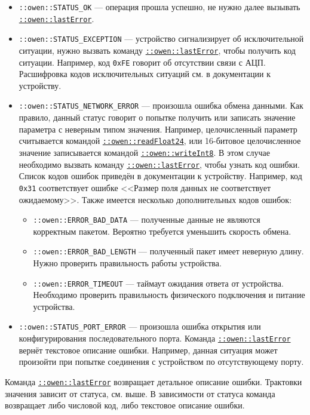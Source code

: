 \documentclass[12pt, a4paper]{article}
\newcommand{\CMD}[1]{{\tt \hyperref[#1]{#1}}}
\begin{document}
\begin{itemize}
\item {\tt ::owen::STATUS\_OK} --- операция прошла успешно, не нужно далее вызывать \CMD{::owen::lastError}.

\item {\tt ::owen::STATUS\_EXCEPTION} --- устройство сигнализирует об исключительной ситуации, нужно вызвать команду \CMD{::owen::lastError}, чтобы получить код ситуации. Например, код {\tt 0xFE} говорит об отсутствии связи с АЦП. Расшифровка кодов исключительных ситуаций см. в документации к устройству.

\item {\tt ::owen::STATUS\_NETWORK\_ERROR} --- произошла ошибка обмена данными. Как правило, данный статус говорит о попытке получить или записать значение параметра с неверным типом значения. Например, целочисленный параметр считывается командой \CMD{::owen::readFloat24}, или 16-битовое целочисленное значение записывается командой \CMD{::owen::writeInt8}. В этом случае необходимо вызвать команду \CMD{::owen::lastError}, чтобы узнать код ошибки. Список кодов ошибок приведён в документации к устройству. Например, код {\tt 0x31} соответствует ошибке <<Размер поля данных не соответствует ожидаемому>>. Также имеется несколько дополнительных кодов ошибок:

\begin{itemize}
\item {\tt ::owen::ERROR\_BAD\_DATA} --- полученные данные не являются корректным пакетом. Вероятно требуется уменьшить скорость обмена.
\item {\tt ::owen::ERROR\_BAD\_LENGTH} --- полученный пакет имеет неверную длину. Нужно проверить правильность работы устройства.
\item {\tt ::owen::ERROR\_TIMEOUT} --- таймаут ожидания ответа от устройства. Необходимо проверить правильность физического подключения и питание устройства.
\end{itemize}

\item {\tt ::owen::STATUS\_PORT\_ERROR} --- произошла ошибка открытия или конфигурирования последовательного порта. Команда \CMD{::owen::lastError} вернёт текстовое описание ошибки. Например, данная ситуация может произойти при попытке соединения с устройством по отсутствующему порту.
\end{itemize}

Команда \CMD{::owen::lastError} возвращает детальное описание ошибки. Трактовки значения зависит от статуса, см. выше. В зависимости от статуса команда возвращает либо числовой код, либо текстовое описание ошибки.
\end{document}
